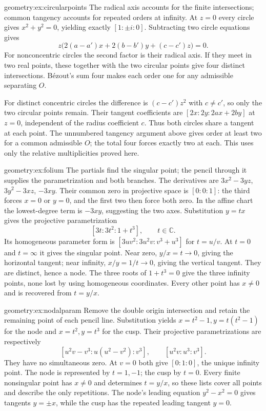\begin{solution}{geometry:ex:circularpoints}
\idea The radical axis accounts for the finite intersections; common tangency accounts for repeated orders at infinity.
\writeup At $z=0$ every circle gives $x^2+y^2=0$, yielding exactly $[1:\pm i:0]$. Subtracting two circle equations gives
\[
z\bigl(2(a-a')x+2(b-b')y+(c-c')z\bigr)=0.
\]
For nonconcentric circles the second factor is their radical axis. If they meet in two real points, these together with the two circular points give four distinct intersections. B\'ezout's sum four makes each order one for any admissible separating $O$.

For distinct concentric circles the difference is $(c-c')z^2$ with $c\ne c'$, so only the two circular points remain. Their tangent coefficients are $[2x:2y:2ax+2by]$ at $z=0$, independent of the radius coefficient $c$. Thus both circles share a tangent at each point. The unnumbered tangency argument above gives order at least two for a common admissible $O$; the total four forces exactly two at each. This uses only the relative multiplicities proved here.
\end{solution}
\begin{solution}{geometry:ex:folium}
\idea The partials find the singular point; the pencil through it supplies the parametrization and both branches.
\writeup The derivatives are $3x^2-3yz$, $3y^2-3xz$, $-3xy$. Their common zero in projective space is $[0:0:1]$: the third forces $x=0$ or $y=0$, and the first two then force both zero. In the affine chart the lowest-degree term is $-3xy$, suggesting the two axes. Substitution $y=tx$ gives the projective parametrization
\[
[3t:3t^2:1+t^3],\qquad t\in\mathbb C.
\]
Its homogeneous parameter form is $[3uv^2:3u^2v:v^3+u^3]$ for $t=u/v$. At $t=0$ and $t=\infty$ it gives the singular point. Near zero, $y/x=t\to0$, giving the horizontal tangent; near infinity, $x/y=1/t\to0$, giving the vertical tangent. They are distinct, hence a node. The three roots of $1+t^3=0$ give the three infinity points, none lost by using homogeneous coordinates. Every other point has $x\ne0$ and is recovered from $t=y/x$.
\end{solution}
\begin{solution}{geometry:ex:nodalparam}
\idea Remove the double origin intersection and retain the remaining point of each pencil line.
\writeup Substitution yields $x=t^2-1,y=t(t^2-1)$ for the node and $x=t^2,y=t^3$ for the cusp. Their projective parametrizations are respectively
\[
[u^2v-v^3:u(u^2-v^2):v^3],\qquad
[u^2v:u^3:v^3].
\]
They have no simultaneous zero. At $v=0$ both give $[0:1:0]$, the unique infinity point. The node is represented by $t=1,-1$; the cusp by $t=0$. Every finite nonsingular point has $x\ne0$ and determines $t=y/x$, so these lists cover all points and describe the only repetitions. The node's leading equation $y^2-x^2=0$ gives tangents $y=\pm x$, while the cusp has the repeated leading tangent $y=0$.
\end{solution}
